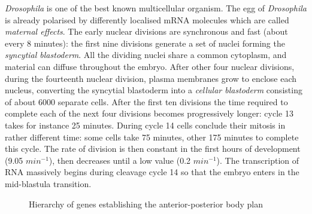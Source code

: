 \documentclass[12pt,a4paper,twoside,openright]{book}
\begin{document}
\emph{Drosophila} is one of the best known multicellular organism. 
%
The egg of  \emph{Drosophila} is already polarised by differently localised mRNA molecules which are called \emph{maternal effects}. 
%
The early nuclear divisions are synchronous and fast (about every 8 minutes): the first nine divisions generate a set of nuclei forming the \emph{syncytial blastoderm}. All the dividing nuclei share a common cytoplasm, and material can diffuse throughout the embryo. 
%
After other four nuclear divisions, during the fourteenth nuclear division, plasma membranes grow to enclose each nucleus, converting the syncytial blastoderm into a \emph{cellular blastoderm} consisting of about 6000 separate cells.  
%
After the first ten divisions the time required to complete each of the next four divisions becomes progressively longer: cycle 13 takes for instance 25 minutes. During cycle 14 cells conclude their mitosis in rather different time: some cells take 75 minutes, other 175 minutes to complete this cycle. The rate of division is then constant in the first hours of development (9.05 $min^{-1}$), then decreases until a low value (0.2 $min^{-1}$).
%
The transcription of RNA massively begins during cleavage cycle 14 so that the embryo enters in the mid-blastula transition.
%
\begin{figure}
\caption{Hierarchy of genes establishing the anterior-posterior body plan}
\label{fig:anterpostpattern}
\end{figure}
\end{document}
